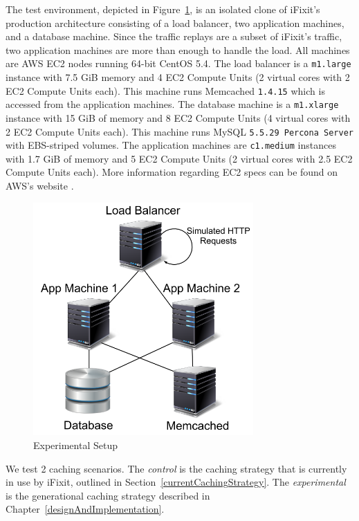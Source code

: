 \documentclass[12pt]{ucthesis}
\begin{document}
The test environment, depicted in Figure~\ref{fig:experimentalArchitecture}, is an isolated clone of \textsf{iFixit}'s production architecture consisting of a load balancer, two application machines, and a database machine.
Since the traffic replays are a subset of \textsf{iFixit}'s traffic, two application machines are more than enough to handle the load.
All machines are AWS EC2 nodes running 64-bit CentOS 5.4.
The load balancer is a {\tt m1.large} instance with 7.5 GiB memory and 4 EC2 Compute Units (2 virtual cores with 2 EC2 Compute Units each).
This machine runs \textsf{Memcached} {\tt 1.4.15} which is accessed from the application machines.
The database machine is a {\tt m1.xlarge} instance with 15 GiB of memory and 8 EC2 Compute Units (4 virtual cores with 2 EC2 Compute Units each).
This machine runs \textsf{MySQL} {\tt 5.5.29 Percona Server} with EBS-striped volumes.
The application machines are {\tt c1.medium} instances with 1.7 GiB of memory and 5 EC2 Compute Units (2 virtual cores with 2.5 EC2 Compute Units each).
More information regarding EC2 specs can be found on AWS's website \cite{awsInstanceTypes}.

\begin{figure}[h]
\centering
\includegraphics[width=0.75\textwidth]{assets/experimentalArchitecture.png}
\caption{Experimental Setup}
\label{fig:experimentalArchitecture}
\end{figure}

We test 2 caching scenarios.
The \textit{control} is the caching strategy that is currently in use by \textsf{iFixit}, outlined in Section~\ref{currentCachingStrategy}.
The \textit{experimental} is the generational caching strategy described in Chapter~\ref{designAndImplementation}.
\end{document}
